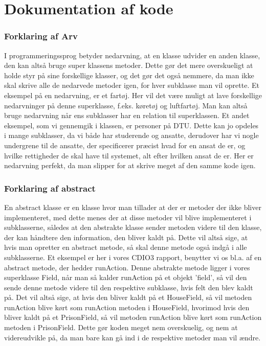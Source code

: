 \section{Dokumentation af kode}

\subsubsection{Forklaring af Arv}
I programmeringssprog betyder nedarvning, at en klasse udvider en anden klasse, den kan altså bruge super klassens metoder. Dette gør det mere overskueligt at holde styr på sine forskellige klasser, og det gør det også nemmere, da man ikke skal skrive alle de nedarvede metoder igen, for hver subklasse man vil oprette. Et eksempel på en nedarvning, er et fartøj. Her vil det være muligt at lave forskellige nedarvninger på denne superklasse, f.eks. køretøj og luftfartøj. Man kan altså bruge nedarvning når ens subklasser har en relation til superklassen. Et andet eksempel, som vi gennemgik i klassen, er personer på DTU. Dette kan jo opdeles i mange subklasser, da vi både har studerende og ansatte, derudover har vi nogle undergrene til de ansatte, der specificerer præcist hvad for en ansat de er, og hvilke rettigheder de skal have til systemet, alt efter hvilken ansat de er. Her er nedarvning perfekt, da man slipper for at skrive meget af den samme kode igen.

\subsubsection{Forklaring af abstract}
En abstract klasse er en klasse hvor man tillader at der er metoder der ikke bliver implementeret, med dette menes der at disse metoder vil blive implementeret i subklasserne, således at den abstrakte klasse sender metoden videre til den klasse, der kan håndtere den information, den bliver kaldt på. Dette vil altså sige, at hvis man opretter en abstract metode, så skal denne metode også indgå i alle subklasserne. Et eksempel er her i vores CDIO3 rapport, benytter vi os bl.a. af en abstract metode, der hedder runAction. Denne abstrakte metode ligger i vores superklasse Field, når man så kalder runAction på et objekt 'field', så vil den sende denne metode videre til den respektive subklasse, hvis felt den blev kaldt på. Det vil altså sige, at hvis den bliver kaldt på et HouseField, så vil metoden runAction blive kørt som runAction metoden i HouseField, hvorimod hvis den bliver kaldt på et PrisonField, så vil metoden runAction blive kørt som runAction metoden i PrisonField. Dette gør koden meget nem overskuelig, og nem at videreudvikle på, da man bare kan gå ind i de respektive metoder man vil ændre.

